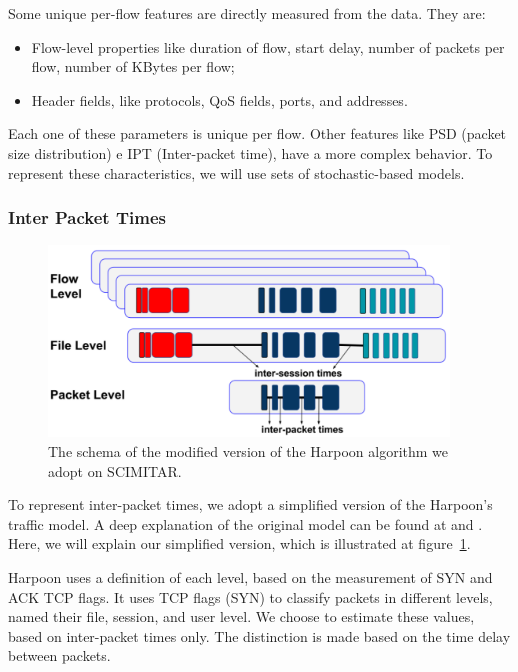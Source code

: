Some unique per-flow features are directly measured from the data. They are:  

\begin{itemize}
\item Flow-level properties like duration of flow, start delay, number of packets per flow, number of KBytes per flow; 
\item Header fields, like protocols, QoS fields, ports, and addresses.
\end{itemize}

Each one of these parameters is unique per flow. Other features like PSD (packet size distribution) e IPT (Inter-packet time), have a more complex behavior.  To represent these characteristics, we will use sets of stochastic-based models.  


\subsubsection{Inter Packet Times}

\begin{figure}[ht!]
    \centering
    \includegraphics[height=2.0in]{figures/ch3/modified-harpoon-model}
    \caption{The schema of the modified version of the Harpoon algorithm we adopt on SCIMITAR.}
    \label{fig:modified-harpoon-model}
\end{figure}


To represent inter-packet times, we adopt a simplified version of the Harpoon's traffic model. A deep explanation of the original model can be found at \cite{harpoon-paper} and \cite{harpoon-validation}. Here, we will explain our simplified version, which is illustrated at figure~\ref{fig:modified-harpoon-model}. 


Harpoon uses a definition of each level, based on the measurement of SYN and ACK TCP flags. It uses TCP flags (SYN) to classify packets in different levels, named their file, session, and user level. We choose to estimate these values, based on inter-packet times only. The distinction is made based on the time delay between packets.


